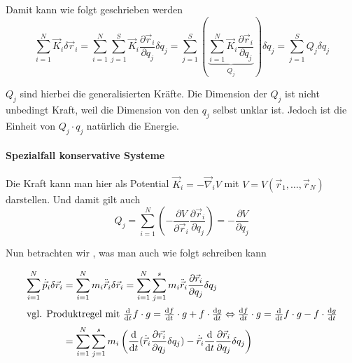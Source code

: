 \documentclass[oneside]{book}
\theoremstyle{definition}
\newcommand{\circled}[1]{\tikz[baseline=(char.base)]{
		\node[shape=circle,draw,inner sep=2pt] (char) {#1};}}
\renewcommand{\d}{\mathrm d}
\newcommand{\dd}[1]{\frac{\d}{\d #1}}
\newcommand{\ddd}[2]{\frac{\d #1}{\d #2}}
\newcommand{\ffpartial}[2]{\frac{\partial #1}{\partial #2}}
\begin{document}
Damit kann \circled{1}  wie folgt geschrieben werden
$$\sum_{i = 1}^N \vec{K}_i \delta \vec{r}_i 
= \sum_{i=1}^N \sum_{j = 1}^S \vec{K}_i \frac{\partial \vec{r}_i}{\partial q_j} \delta q_j
= \sum_{j=1}^S \left( \underbrace{\sum_{i = 1}^N \vec{K}_i \frac{\partial \vec{r}_i}{\partial q_j}}_{Q_j} \right) \delta q_j
= \sum_{j = 1}^S Q_j \delta q_j$$

$Q_j$ sind hierbei die generalisierten Kräfte. Die Dimension der $Q_j$ ist nicht unbedingt Kraft, weil die Dimension von den $q_j$ selbst unklar ist. Jedoch ist die Einheit von $Q_j \cdot q_j$ natürlich die Energie.

\paragraph{Spezialfall konservative Systeme}
Die Kraft kann man hier als Potential $\vec{K}_i = - \vec\nabla_i V$ mit $V = V(\vec{r}_1, \dots, \vec{r}_N)$ darstellen. Und damit gilt auch
$$Q_j = \sum_{i = 1}^N (- \frac{\partial V}{\partial \vec{r}_i} \ffpartial{\vec{r}_i}{q_j}) = - \ffpartial{V}{q_j}$$

Nun betrachten wir \circled{2}, was man auch wie folgt schreiben kann

\begin{align*}
\sum_{i = 1}^{N} \dot{\vec{p}}_i \delta \vec{r}_i 
&= \sum_{i = 1}^N m_i \ddot{\vec{r}}_i \delta \vec{r}_i 
= \sum_{i = 1}^N \sum_{j = 1}^s m_i \ddot{\vec{r}}_i  \ffpartial{\vec{r}_i}{q_j} \delta q_j \\
\intertext{vgl. Produktregel mit $\dd t f \cdot g = \ddd{f}{t} \cdot g + f \cdot \ddd{g}{t} \Leftrightarrow \ddd{f}{t} \cdot g = \dd t f \cdot g - f \cdot \ddd{g}{t}$}
&= \sum_{i=1}^N \sum_{j=1}^s m_i \left(\dd{t} (\dot{\vec{r}}_i \ffpartial{\vec{r_i}}{q_j} \delta q_j) -\dot{\vec{r}}_i \dd{t} \ffpartial{\vec{r}_i}{q_j} \delta q_j \right)
\end{align*}
\end{document}

